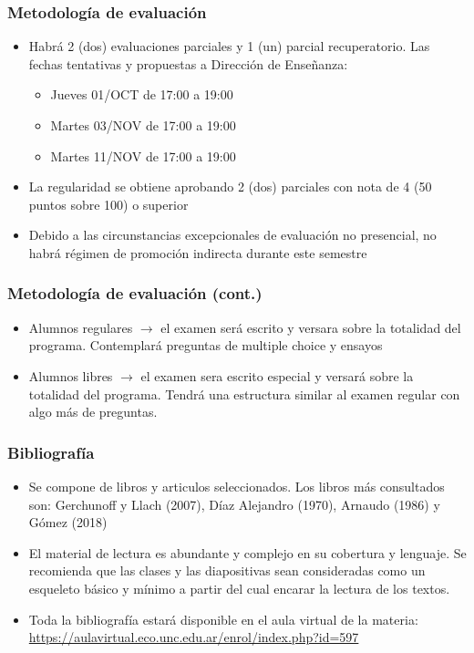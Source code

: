 \documentclass[14pt,aspectratio=169]{beamer}
\begin{document}
  \begin{frame}\frametitle{Metodología de evaluación}
     \begin{itemize}
     \item Habrá 2 (dos) evaluaciones parciales y 1 (un) parcial
       recuperatorio. Las fechas tentativas y propuestas a Dirección
       de Enseñanza: 
       \begin{itemize} \medskip
       \item Jueves 01/OCT de 17:00 a 19:00
       \item Martes 03/NOV de 17:00 a 19:00
         \item Martes 11/NOV de 17:00 a 19:00
         \end{itemize}
       \item La regularidad se obtiene aprobando 2 (dos) parciales con
         nota de 4 (50 puntos sobre 100) o superior
         \item Debido a las circunstancias excepcionales de evaluación
           no presencial, no habrá régimen de promoción indirecta
           durante este semestre
       \end{itemize}
     \end{frame}


     \begin{frame}\frametitle{Metodología de evaluación (cont.)}
     \begin{itemize}
     \item Alumnos regulares $\longrightarrow$ el examen será
       escrito y versara sobre la totalidad del programa. Contemplará
       preguntas de multiple choice y ensayos
       \item Alumnos libres $\longrightarrow$ el examen sera escrito
         especial y versará sobre la totalidad del programa. Tendrá
         una estructura similar al examen regular con algo más de
         preguntas. 
       \end{itemize}
  \end{frame}


  
  
  
\begin{frame}\frametitle{Bibliografía}
     \begin{itemize}
     \item Se compone de libros y articulos seleccionados. Los libros
       más consultados son: Gerchunoff y Llach (2007), Díaz Alejandro
       (1970), Arnaudo (1986) y Gómez (2018)
       \item El material de lectura es abundante y complejo en su
         cobertura y lenguaje. Se recomienda que las clases y
         las diapositivas sean consideradas como un esqueleto básico y
         mínimo a partir del cual encarar la lectura de los textos.
         \item Toda la bibliografía estará disponible en el aula
           virtual de la materia:
           \url{https://aulavirtual.eco.unc.edu.ar/enrol/index.php?id=597} 
       \end{itemize}
  \end{frame}
\end{document}
